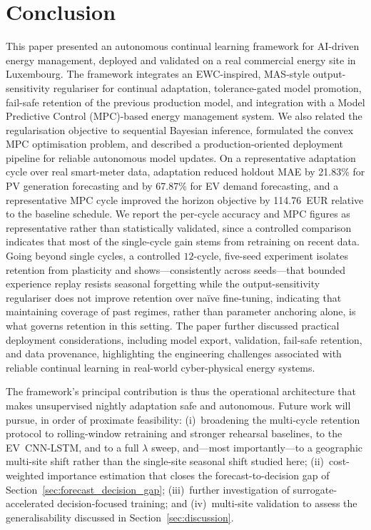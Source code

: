 \documentclass[journal]{IEEEtran}
\begin{document}
\section{Conclusion}
\label{sec:conclusion}

This paper presented an autonomous continual learning
framework for AI-driven energy management, deployed and
validated on a real commercial energy site in Luxembourg.
The framework integrates an EWC-inspired, MAS-style
output-sensitivity regulariser for continual adaptation,
tolerance-gated model promotion, fail-safe retention of the
previous production model, and integration with a Model
Predictive Control (MPC)-based energy management system.
We also related the regularisation objective to sequential
Bayesian inference, formulated the convex MPC optimisation
problem, and described a production-oriented deployment
pipeline for reliable autonomous model updates.
On a representative adaptation cycle over real smart-meter
data, adaptation reduced holdout MAE by 21.83\% for PV
generation forecasting and by 67.87\% for EV demand
forecasting, and a representative MPC cycle improved the
horizon objective by 114.76~EUR relative to the baseline
schedule. We report the per-cycle accuracy and MPC figures as
representative rather than statistically validated, since a controlled
comparison indicates that most of the single-cycle gain stems from
retraining on recent data. Going beyond single cycles, a controlled
$12$-cycle, five-seed experiment isolates retention from plasticity and
shows---consistently across seeds---that bounded experience replay resists
seasonal forgetting while the output-sensitivity regulariser does not
improve retention over na\"ive fine-tuning, indicating that maintaining
coverage of past regimes, rather than parameter anchoring alone, is what
governs retention in this setting. The paper
further discussed practical deployment considerations,
including model export, validation, fail-safe retention, and
data provenance, highlighting the engineering challenges
associated with reliable continual learning in real-world
cyber-physical energy systems.

The framework's principal contribution is thus the operational
architecture that makes unsupervised nightly adaptation safe and
autonomous. Future work will pursue, in order of proximate
feasibility: (i)~broadening the multi-cycle retention protocol to
rolling-window retraining and stronger rehearsal baselines, to the
EV~CNN-LSTM, and to a full $\lambda$ sweep, and---most importantly---to a
geographic multi-site shift rather than the single-site seasonal shift
studied here;
(ii)~cost-weighted importance estimation that closes the
forecast-to-decision gap of Section~\ref{sec:forecast_decision_gap};
(iii)~further investigation of surrogate-accelerated decision-focused
training; and (iv)~multi-site validation to assess the generalisability
discussed in Section~\ref{sec:discussion}.
\end{document}

